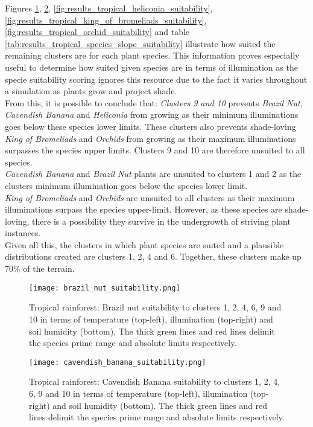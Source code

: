 Figures \ref{fig:results_tropical_brazil_nut_suitability}, \ref{fig:results_tropical_cavendish_banana_suitability}, \ref{fig:results_tropical_heliconia_suitability}, \ref{fig:results_tropical_king_of_bromeliads_suitability}, \ref{fig:results_tropical_orchid_suitability} and table \ref{tab:results_tropical_species_slope_suitability} illustrate how suited the remaining clusters are for each plant species. This information proves especially useful to determine how suited given species are in terms of illumination as the specie suitability scoring ignores this resource due to the fact it varies throughout a simulation as plants grow and project shade.\\
From this, it is possible to conclude that: \textit{Clusters 9 and 10} prevents \textit{Brazil Nut}, \textit{Cavendish Banana} and \textit{Heliconia} from growing as their minimum illuminations goes below these species lower limits. These clusters also prevents shade-loving \textit{King of Bromeliads} and \textit{Orchids} from growing as their maximum illuminations surpasses the species upper limits. Clusters 9 and 10 are therefore unsuited to all species.\\
\textit{Cavendish Banana} and \textit{Brazil Nut} plants are unsuited to clusters 1 and 2 as the clusters minimum illumination goes below the species lower limit.\\
\textit{King of Bromeliads} and \textit{Orchids} are unsuited to all clusters as their maximum illuminations surpass the species upper-limit. However, as these species are shade-loving, there is a possibility they survive in the undergrowth of striving plant instances.\\
Given all this, the clusters in which plant species are suited and a plausible distributions created are clusters 1, 2, 4 and 6. Together, these clusters make up 70\% of the terrain.\\

\begin{figure}
\center
	\texttt{[image: brazil\_nut\_suitability.png]}
	\caption{ Tropical rainforest: Brazil nut suitability to clusters 1, 2, 4, 6, 9 and 10 in terms of temperature (top-left), illumination (top-right) and soil humidity (bottom). The thick green lines and red lines delimit the species prime range and absolute limits respectively. }
	\label{fig:results_tropical_brazil_nut_suitability}
\end{figure}

\begin{figure}
\center
	\texttt{[image: cavendish\_banana\_suitability.png]}
	\caption{ Tropical rainforest: Cavendish Banana suitability to clusters 1, 2, 4, 6, 9 and 10 in terms of temperature (top-left), illumination (top-right) and soil humidity (bottom). The thick green lines and red lines delimit the species prime range and absolute limits respectively.}
	\label{fig:results_tropical_cavendish_banana_suitability}
\end{figure}

